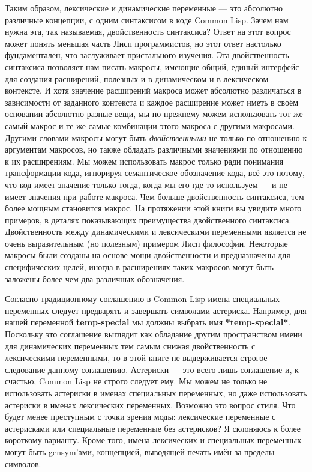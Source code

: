 Таким образом, лексические и динамические переменные --- это абсолютно различные концепции, с одним синтаксисом в коде Common Lisp. Зачем нам нужна эта, так называемая, двойственность синтаксиса? Ответ на этот вопрос может понять меньшая часть Лисп программистов, но этот ответ настолько фундаментален, что заслуживает пристального изучения. Эта двойственность синтаксиса позволяет нам писать макросы, имеющие общий, единый интерфейс для создания расширений, полезных и в динамическом и в лексическом контексте. И хотя значение расширений макроса может абсолютно различаться в зависимости от заданного контекста и каждое расширение может иметь в своём основании абсолютно разные вещи, мы по прежнему можем использовать тот же самый макрос и те же самые комбинации этого макроса с другими макросами. Другими словами макросы могут быть \emph{двойственными} не только по отношению к аргументам макросов, но также обладать различными значениями по отношению к их расширениям. Мы можем использовать макрос только ради понимания трансформации кода, игнорируя семантическое обозначение кода, всё это потому, что код имеет значение только тогда, когда мы его где то используем --- и не имеет значения при работе макроса. Чем больше двойственность синтаксиса, тем более мощным становится макрос. На протяжении этой книги вы увидите много примеров, в деталях показывающих преимущества двойственного синтаксиса. Двойственность между динамическими и лексическими переменными является не очень выразительным (но полезным) примером Лисп философии. Некоторые макросы были созданы на основе мощи двойственности и предназначены для специфических целей, иногда в расширениях таких макросов могут быть заложены более чем два различных обозначения.

Согласно традиционному соглашению в Common Lisp имена специальных переменных следует предварять и завершать символами астериска. Например, для нашей переменной \textbf{temp-special} мы должны выбрать имя \textbf{*temp-special*}. Поскольку это соглашение выглядит как обладание другим пространством имени для динамических переменных тем самым снижая двойственность с лексическими переменными, то в этой книге не выдерживается строгое следование данному соглашению. Астериски --- это всего лишь соглашение и, к счастью, Common Lisp не строго следует ему. Мы можем не только не использовать астериски в именах специальных переменных, но даже использовать астериски в именах лексических переменных. Возможно это вопрос стиля. Что будет менее преступным с точки зрения моды: лексические переменные с астерисками или специальные переменные без астерисков? Я склоняюсь к более короткому варианту. Кроме того, имена лексических и специальных переменных могут быть gensym'ами, концепцией, выводящей печать имён за пределы символов.

